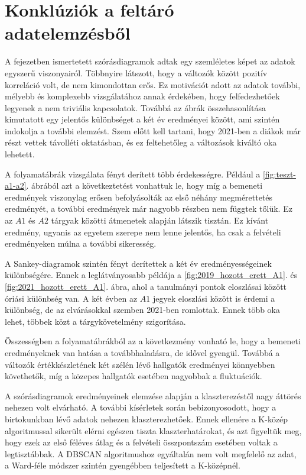 \documentclass[12pt]{article}
\begin{document}
\section{Konklúziók a feltáró adatelemzésből}

A fejezetben ismertetett szórásdiagramok adtak egy szemléletes képet az adatok egyszerű viszonyairól. Többnyire látszott, hogy a változók között pozitív korreláció volt, de nem kimondottan erős. Ez motivációt adott az adatok további, mélyebb és komplexebb vizsgálatához annak érdekében, hogy felfedezhetőek legyenek a nem triviális kapcsolatok. Továbbá az ábrák összehasonlítása kimutatott egy jelentős különbséget a két év eredményei között, ami szintén indokolja a további elemzést. Szem előtt kell tartani, hogy 2021-ben a diákok már részt vettek távolléti oktatásban, és ez feltehetőleg a változások kiváltó oka lehetett.

A folyamatábrák vizsgálata fényt derített több érdekességre. Például a \ref{fig:teszt-a1-a2}. ábrából azt a következtetést vonhattuk le, hogy míg a bemeneti eredmények viszonylag erősen befolyásolták az első néhány megmérettetés eredményét, a további eredmények már nagyobb részben nem függtek tőlük. Ez az $A1$ és $A2$ tárgyak közötti átmenetek alapján látszik tisztán. Ez kívánt eredmény, ugyanis az egyetem szerepe nem lenne jelentős, ha csak a felvételi eredményeken múlna a további sikeresség.

A Sankey-diagramok szintén fényt derítettek a két év eredményességeinek különbségére. Ennek a leglátványosabb példája a \ref{fig:2019_hozott_erett_A1}. és \ref{fig:2021_hozott_erett_A1}. ábra, ahol a tanulmányi pontok eloszlásai között óriási különbség van. A két évben az $A1$ jegyek eloszlási között is érdemi a különbség, de az elvárásokkal szemben 2021-ben romlottak. Ennek több oka lehet, többek közt a tárgykövetelmény szigorítása.

Összességben a folyamatábrákból az a következmény vonható le, hogy a bemeneti eredményeknek van hatása a továbbhaladásra, de idővel gyengül. Továbbá a változók értékkészletének két szélén lévő hallgatók eredményei könnyebben követhetők, míg a közepes hallgatók esetében nagyobbak a fluktuációk.

A szórásdiagramok eredményeinek elemzése alapján a klaszterezéstől nagy áttörés nehezen volt elvárható. A további kísérletek során bebizonyosodott, hogy a birtokunkban lévő adatok nehezen klaszterezhetőek. Ennek ellenére a K-közép algoritmussal sikerült elérni egészen tiszta klaszterhatárokat, és azt figyeltük meg, hogy ezek az első féléves átlag és a felvételi összpontszám esetében voltak a legtisztábbak. A DBSCAN algoritmushoz egyáltalán nem volt megfelelő az adat, a Ward-féle módszer szintén gyengébben teljesített a K-középnél.
\end{document}
